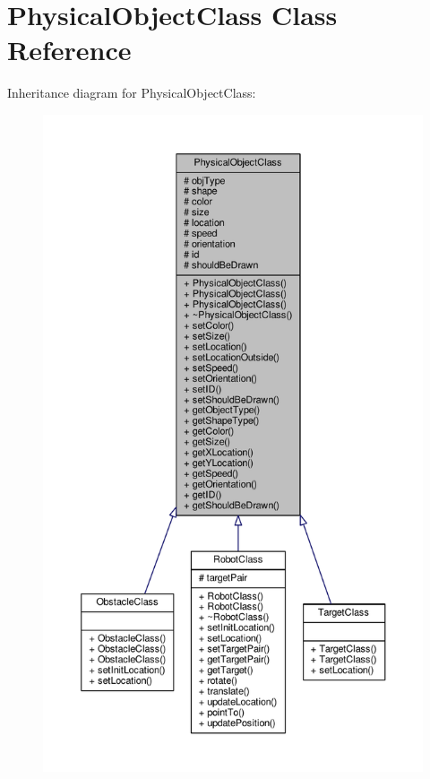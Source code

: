 \hypertarget{classPhysicalObjectClass}{\section{Physical\-Object\-Class Class Reference}
\label{classPhysicalObjectClass}
}


Inheritance diagram for Physical\-Object\-Class\-:
\nopagebreak
\begin{figure}[H]
\begin{center}
\leavevmode
\includegraphics[height=550pt]{classPhysicalObjectClass__inherit__graph}
\end{center}
\end{figure}



